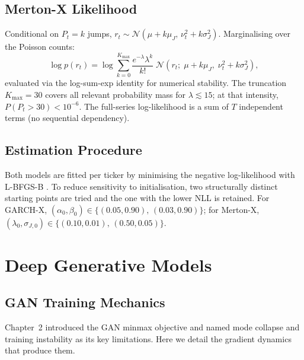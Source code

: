 \subsection{Merton-X Likelihood}

Conditional on $P_t = k$ jumps, $r_t \sim \mathcal{N}(\mu + k\mu_J,\,
\nu_t^2 + k\sigma_J^2)$. Marginalising over the Poisson counts:
\begin{equation}
    \label{eq:mertonx_loglik_app}
    \log p(r_t) = \log \sum_{k=0}^{K_{\max}}
        \frac{e^{-\lambda}\lambda^k}{k!}\;
        \mathcal{N}\!\left(r_t;\; \mu + k\mu_J,\;
        \nu_t^2 + k\sigma_J^2\right),
\end{equation}
evaluated via the log-sum-exp identity for numerical stability. The
truncation $K_{\max} = 30$ covers all relevant probability mass for
$\lambda \lesssim 15$; at that intensity, $P(P_t > 30) < 10^{-6}$.
The full-series log-likelihood is a sum of $T$ independent terms (no
sequential dependency).

\subsection{Estimation Procedure}

Both models are fitted per ticker by minimising the negative
log-likelihood with L-BFGS-B \cite{byrd1995limited}. To reduce
sensitivity to initialisation, two structurally distinct starting
points are tried and the one with the lower NLL is retained. For
GARCH-X, $(\alpha_0, \beta_0) \in \{(0.05, 0.90),\, (0.03, 0.90)\}$;
for Merton-X, $(\lambda_0, \sigma_{J,0}) \in \{(0.10, 0.01),\,
(0.50, 0.05)\}$.

\section{Deep Generative Models}
\label{app:sec:dgm}

\subsection{GAN Training Mechanics}

Chapter~2 introduced the GAN minmax objective and named mode collapse and
training instability as its key limitations. Here we detail the gradient
dynamics that produce them.\\

